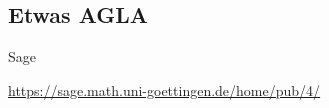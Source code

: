 \documentclass[hyperref={xetex}]{beamer}
\begin{document}
\subsection{Etwas AGLA}
\begin{frame}[fragile]{Sage}
\begin{center}
\url{https://sage.math.uni-goettingen.de/home/pub/4/}
\end{center}
\end{frame}
%
%
%
%
%
\end{document}
